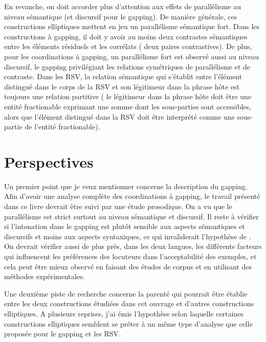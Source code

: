 En revanche, on doit accorder plus d’attention aux effets de parallélisme au niveau sémantique (et discursif pour le gapping). De manière générale, ces cons\-tructions elliptiques mettent en jeu un parallélisme sémantique fort. Dans les constructions à gapping, il doit y avoir au moins deux contrastes sémantiques entre les éléments résiduels et les corrélats ({\cad} deux paires contrastives). De plus, pour les coordinations à gapping, un parallélisme fort est observé aussi au niveau discursif, le gapping privilégiant les relations symétriques de parallélisme et de contraste. Dans les RSV, la relation sémantique qui s’établit entre l’élément distingué dans le corps de la RSV et son légitimeur dans la phrase hôte est toujours une relation partitive ({\cad} le légitimeur dans la phrase hôte doit être une entité fractionable exprimant une somme dont les sous-parties sont accessibles, alors que l’élément distingué dans la RSV doit être interprété comme une sous-partie de l’entité fractionable). 


\section{Perspectives}\label{concl:sect3}


Un premier point que je veux mentionner concerne la description du gapping. Afin d’avoir une analyse complète des coordinations à gapping, le travail présenté dans ce livre devrait être suivi par une étude prosodique. On a vu que le parallélisme est strict surtout au niveau sémantique et discursif. Il reste à vérifier si l’intonation dans le gapping est plutôt sensible aux aspects sémantiques et discursifs et moins aux aspects syntaxiques, ce qui invaliderait l’hypothèse de \citet{FeryEtAl2005}. On devrait vérifier aussi de plus près, dans les deux langues, les différents facteurs qui influencent les préférences des locuteurs dans l’acceptabilité des exemples, et cela peut être mieux observé en faisant des études de corpus et en utilisant des méthodes expérimentales.

Une deuxième piste de recherche concerne la parenté qui pourrait être établie entre les deux constructions étudiées dans cet ouvrage et d’autres constructions elliptiques. A plusieurs reprises, j’ai émis l’hypothèse selon laquelle certaines constructions elliptiques semblent se prêter à un même type d’analyse que celle proposée pour le gapping et les RSV. 

